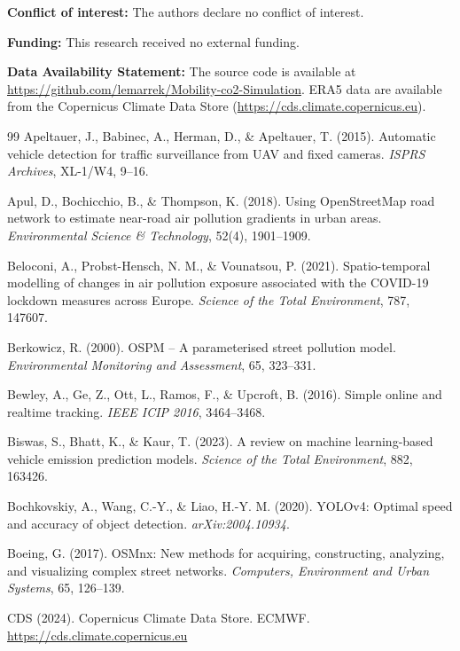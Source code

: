 \documentclass[12pt,a4paper]{article}
\begin{document}
\textbf{Conflict of interest:} The authors declare no conflict of interest.

\textbf{Funding:} This research received no external funding.

\textbf{Data Availability Statement:} The source code is available at \url{https://github.com/lemarrek/Mobility-co2-Simulation}. ERA5 data are available from the Copernicus Climate Data Store (\url{https://cds.climate.copernicus.eu}).

\begin{thebibliography}{99}
Apeltauer, J., Babinec, A., Herman, D., \& Apeltauer, T. (2015). Automatic vehicle detection for traffic surveillance from UAV and fixed cameras. \textit{ISPRS Archives}, XL-1/W4, 9--16.

Apul, D., Bochicchio, B., \& Thompson, K. (2018). Using OpenStreetMap road network to estimate near-road air pollution gradients in urban areas. \textit{Environmental Science \& Technology}, 52(4), 1901--1909.

Beloconi, A., Probst-Hensch, N. M., \& Vounatsou, P. (2021). Spatio-temporal modelling of changes in air pollution exposure associated with the COVID-19 lockdown measures across Europe. \textit{Science of the Total Environment}, 787, 147607.

Berkowicz, R. (2000). OSPM -- A parameterised street pollution model. \textit{Environmental Monitoring and Assessment}, 65, 323--331.

Bewley, A., Ge, Z., Ott, L., Ramos, F., \& Upcroft, B. (2016). Simple online and realtime tracking. \textit{IEEE ICIP 2016}, 3464--3468.

Biswas, S., Bhatt, K., \& Kaur, T. (2023). A review on machine learning-based vehicle emission prediction models. \textit{Science of the Total Environment}, 882, 163426.

Bochkovskiy, A., Wang, C.-Y., \& Liao, H.-Y. M. (2020). YOLOv4: Optimal speed and accuracy of object detection. \textit{arXiv:2004.10934}.

Boeing, G. (2017). OSMnx: New methods for acquiring, constructing, analyzing, and visualizing complex street networks. \textit{Computers, Environment and Urban Systems}, 65, 126--139.

CDS (2024). Copernicus Climate Data Store. ECMWF. \url{https://cds.climate.copernicus.eu}


\end{thebibliography}
\end{document}

